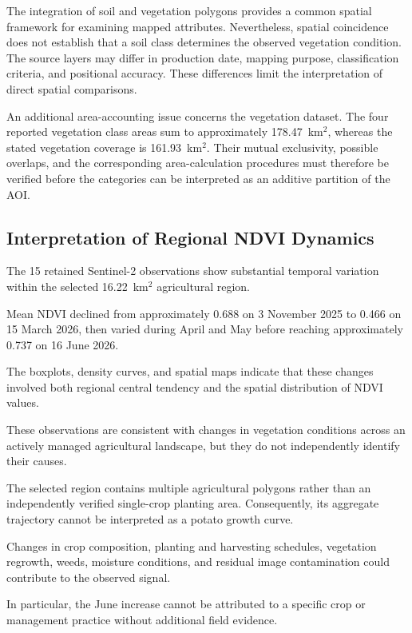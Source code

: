 The integration of soil and vegetation polygons
provides a common spatial framework for examining
mapped attributes. Nevertheless, spatial coincidence
does not establish that a soil class determines
the observed vegetation condition. The source
layers may differ in production date, mapping
purpose, classification criteria, and positional
accuracy. These differences limit the interpretation
of direct spatial comparisons.

An additional area-accounting issue concerns the
vegetation dataset. The four reported vegetation
class areas sum to approximately 178.47~km$^2$,
whereas the stated vegetation coverage is
161.93~km$^2$. Their mutual exclusivity, possible
overlaps, and the corresponding area-calculation
procedures must therefore be verified before the
categories can be interpreted as an additive
partition of the AOI.


\subsection{Interpretation of Regional NDVI Dynamics}

The 15 retained Sentinel-2 observations show
substantial temporal variation within the selected
16.22~km$^2$ agricultural region.

Mean NDVI declined from approximately 0.688
on 3 November 2025 to 0.466 on 15 March 2026,
then varied during April and May before reaching
approximately 0.737 on 16 June 2026.

The boxplots, density curves, and spatial maps
indicate that these changes involved both
regional central tendency and the spatial
distribution of NDVI values.

These observations are consistent with changes
in vegetation conditions across an actively
managed agricultural landscape, but they do
not independently identify their causes.

The selected region contains multiple agricultural
polygons rather than an independently verified
single-crop planting area. Consequently, its
aggregate trajectory cannot be interpreted as
a potato growth curve.

Changes in crop composition, planting and
harvesting schedules, vegetation regrowth,
weeds, moisture conditions, and residual
image contamination could contribute to
the observed signal.

In particular, the June increase cannot be
attributed to a specific crop or management
practice without additional field evidence.

